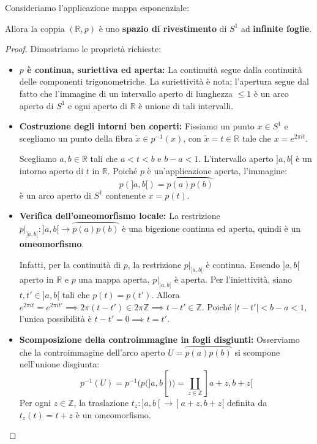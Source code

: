 \begin{ejemplo}
Consideriamo l'applicazione mappa esponenziale:

Allora la coppia $(\mathbb{R}, p)$ è uno \textbf{spazio di rivestimento} di $S^1$ ad \textbf{infinite foglie}.

\begin{proof}
Dimostriamo le proprietà richieste:

\begin{itemize}
    \item \textbf{$p$ è continua, suriettiva ed aperta:}
    La continuità segue dalla continuità delle componenti trigonometriche. La suriettivit\`a \`e nota; l'apertura segue dal fatto che l'immagine di un intervallo aperto di lunghezza $\leqslant 1$ \`e un arco aperto di $S^1$ e ogni aperto di $\mathbb{R}$ \`e unione di tali intervalli.

    \item \textbf{Costruzione degli intorni ben coperti:}
    Fissiamo un punto $x \in S^1$ e scegliamo un punto della fibra $\widetilde{x} \in p^{-1}(x)$, con $\widetilde{x} = t \in \mathbb{R}$ tale che $x = e^{2\pi i t}$.

    Scegliamo $a, b \in \mathbb{R}$ tali che $a < t < b$ e $b - a < 1$.
    L'intervallo aperto $]a, b[$ è un intorno aperto di $t$ in $\mathbb{R}$. Poiché $p$ è un'applicazione aperta, l'immagine:
    \[
    p(]a, b[) = \wideparen{p(a)p(b)}
    \]
    è un arco aperto di $S^1$ contenente $x = p(t)$.

    \item \textbf{Verifica dell'omeomorfismo locale:}
    La restrizione $p|_{]a,b[}: ]a,b[ \to \wideparen{p(a)p(b)}$ è una bigezione continua ed aperta, quindi è un \textbf{omeomorfismo}.

    Infatti, per la continuità di $p$, la restrizione $p|_{]a,b[}$ è continua. Essendo $]a,b[$ aperto in $\mathbb{R}$ e $p$ una mappa aperta, $p|_{]a,b[}$ è aperta.
    Per l'iniettività, siano $t, t' \in ]a,b[$ tali che $p(t) = p(t')$.
    Allora $e^{2\pi i t} = e^{2\pi i t'} \implies 2\pi(t - t') \in 2\pi\mathbb{Z} \implies t - t' \in \mathbb{Z}$.
    Poiché $|t - t'| < b - a < 1$, l'unica possibilità è $t - t' = 0 \implies t = t'$.

    \item \textbf{Scomposizione della controimmagine in fogli disgiunti:}
    Osserviamo che la controimmagine dell'arco aperto $U = \wideparen{p(a)p(b)}$ si scompone nell'unione disgiunta:
    \[
    p^{-1}(U) = p^{-1}(p(]a,b[)) = \coprod_{z \in \mathbb{Z}} ]a+z, b+z[
    \]
    Per ogni $z \in \mathbb{Z}$, la traslazione $t_z: ]a,b[ \to ]a+z, b+z[$ definita da $t_z(t) = t + z$ è un omeomorfismo.


\end{itemize}
\end{proof}
\end{ejemplo}
